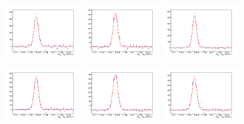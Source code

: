 \begin{figure}[!h]
\begin{center}
\includegraphics[width=0.3\textwidth]{figures/Dstar/pp13TeV/multi_trial/residual_plot_std_bkg_func_7-7dot5GeV.png} 
\includegraphics[width=0.3\textwidth]{figures/Dstar/pp13TeV/multi_trial/residual_plot_std_bkg_func_7dot5-8GeV.png}
\includegraphics[width=0.3\textwidth]{figures/Dstar/pp13TeV/multi_trial/residual_plot_std_bkg_func_8-9GeV.png} 

\includegraphics[width=0.3\textwidth]{figures/Dstar/pp13TeV/multi_trial/residual_plot_std_bkg_func_9-10GeV.png} 
\includegraphics[width=0.3\textwidth]{figures/Dstar/pp13TeV/multi_trial/residual_plot_std_bkg_func_10-12GeV.png}
\includegraphics[width=0.3\textwidth]{figures/Dstar/pp13TeV/multi_trial/residual_plot_std_bkg_func_12-16GeV.png} 


\end{center}
\end{figure}
